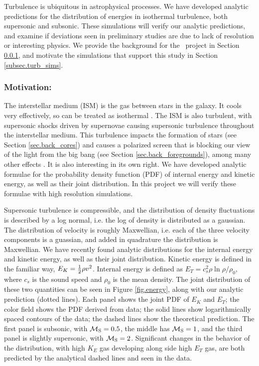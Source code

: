 Turbulence is ubiquitous in astrophysical processes.  We have developed analytic
predictions for the distribution of energies in isothermal turbulence, both
supersonic and subsonic. These simulations will verify our analytic predictions,
and examine if deviations seen in preliminary studies are due to lack of
resolution or interesting physics.
We provide the background for the \nameTurbulence\ project in Section
\ref{subsec.turb_motivate},
and motivate the simulations that support this study in Section
\ref{subsec.turb_sims}.


\subsubsection{Motivation: \nameTurbulence}
\label{subsec.turb_motivate}

The interstellar medium (ISM) is the gas between stars in the galaxy.  It cools
very effectively, so can be treated as isothermal .  The ISM is also turbulent, with supersonic shocks driven by supernovae
causing supersonic turbulence throughout the interstellar medium.  This
turbulence impacts the formation of stars (see Section \ref{sec.back_cores}) and
causes a polarized screen that is blocking our view of the light from the big bang (see
Section \ref{sec.back_foregrounds}), among many other effects
\citep{Elmegreen04}. It is also interesting in its own right.  We have developed
analytic formulae for the probability density function (PDF) of internal energy
and kinetic energy, as well as their joint distribution.  In this project we
will verify these formulae with high resolution simulations.

Supersonic turbulence is compressible, and the distribution of density
fluctuations is described by a log normal, i.e. the log of density is
distributed as a gaussian.  The distribution of velocity is roughly Maxwellian,
i.e. each of the three velocity components is a guassian, and added in quadrature the
distribution is Maxwellian.  
We have recently found analytic distributions for the internal energy and
kinetic energy, as well as their joint
distribution.   Kinetic energy is defined in the familiar way, $E_K=\frac{1}{2} \rho
v^2$.  Internal energy is defined as $E_T= c_s^2 \rho \ln \rho/\rho_0$, where
$c_s$ is the sound speed and $\rho_0$ is the mean density.  The joint
distribution of these two quantities can be seen in Figure \ref{fig.energy},
along with our analytic prediction (dotted lines).
Each panel shows the joint PDF of $E_K$ and $E_T$;  the color field shows the
PDF derived from data; the solid lines show logarithmically spaced contours of
the data; the dashed lines show the theoretical prediction.  The first panel is
subsonic, with $\mathcal{M_{\rm{S}}}=0.5$, the middle has $\mathcal{M_{\rm{S}}}=1$, and the third panel is
slightly supersonic, with $\mathcal{M_{\rm{S}}}=2$.  Significant changes in the behavior of the
distribution, with high $K_E$ gas developing along side high $E_T$ gas, are both
predicted by the analytical dashed lines and seen in the data.

